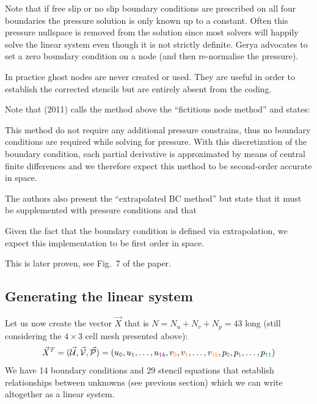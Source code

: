Note that if free slip or no slip boundary conditions are prescribed on all four boundaries the 
pressure solution is only known up to a constant. Often this pressure nullspace is removed 
from the solution since most solvers will happily solve the linear system even though it is not 
strictly definite. Gerya advocates to set a zero boundary condition on a node (and then re-normalise the 
pressure).

In practice ghost nodes are never created or used. They are useful in order to 
establish the corrected stencils but are entirely absent from the coding.

Note that \textcite{dumg11} (2011) calls the method above the ``fictitious node method''
and states:
\begin{displayquote}
{\color{darkgray}
This method do not require any additional
pressure constrains, thus no boundary conditions are
required while solving for pressure. With this discretization of the boundary condition, each partial
derivative is approximated by means of central finite
differences and we therefore expect this method to
be second‐order accurate in space.
}
\end{displayquote}
The authors also present the ``extrapolated BC method''
but state that it must be supplemented with pressure conditions and that 
\begin{displayquote}
{\color{darkgray}
Given the fact that the boundary condition is
defined via extrapolation, we expect this implementation to be first order in space.
}
\end{displayquote}
This is later proven, see Fig.~7 of the paper.

\subsection{Generating the linear system}

Let us now create the vector $\vec{X}$ that is $N=N_u+N_v+N_p=43$ long 
(still considering 
the $4\times 3$ cell mesh presented above):
\[
\vec{X}^T=(\vec{\cal U}, \vec{\cal V}, \vec{\cal P} )=(
u_{\tt \color{violet} 0},u_{\tt \color{violet} 1}, \dots , u_{\tt \color{violet} 14},
v_{\tt \color{orange} 0},v_{\tt \color{orange} 1}, \dots , v_{\tt \color{orange} 15},
p_{\tt \color{teal} 0},p_{\tt \color{teal} 1}, \dots, p_{\tt \color{teal} 11})
\]
We have 14 boundary conditions and 29 stencil equations that establish relationships between 
unknowns  (see previous section) which we can write altogether as a linear system.

